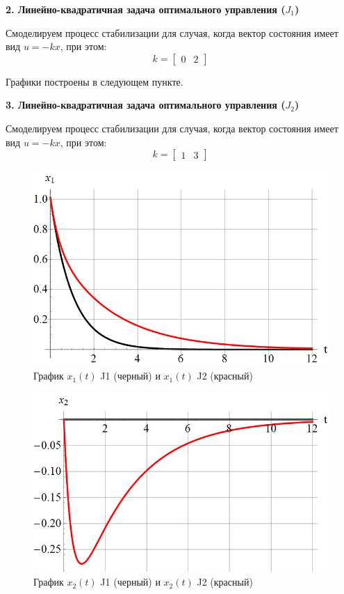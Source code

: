 \newpage

\textbf{2. Линейно-квадратичная задача оптимального управления ($ J_1 $)}

Смоделируем процесс стабилизации для случая, когда вектор состояния имеет вид $ u=-kx $, при этом:
$$
k = \begin{bmatrix} 0 & 2 \end{bmatrix}
$$

Графики построены в следующем пункте.

\textbf{3. Линейно-квадратичная задача оптимального управления ($ J_2 $)}

Смоделируем процесс стабилизации для случая, когда вектор состояния имеет вид $ u=-kx $, при этом:
$$
k = \begin{bmatrix} 1 & 3 \end{bmatrix}
$$

\begin{figure}[h]
    \centering
    \includegraphics[scale=0.4]{chapter_x6/fig3.png}
    \caption{График $ x_1(t) $ J1 (черный) и $ x_1(t) $ J2 (красный) }
    \label{}
\end{figure}

\begin{figure}[h]
    \centering
    \includegraphics[scale=0.4]{chapter_x6/fig4.png}
    \caption{График $ x_2(t) $ J1 (черный) и $ x_2(t) $ J2 (красный) }
    \label{}
\end{figure}

